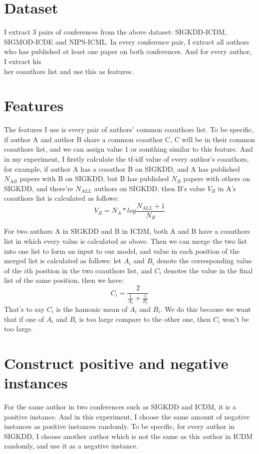 \documentclass{sigkddExp}
\begin{document}
\section{Dataset}
I extract 3 pairs of conferences from the above dataset: SIGKDD-ICDM,
SIGMOD-ICDE and NIPS-ICML. In every conference pair, I extract all authors
who has published at least one paper on both conferences. And for every
author, I extract his\\her coauthors list and use this as features.

\section{Features}
The features I use is every pair of authors' common coauthors list. To be
specific, if author A and author B share a common coauthor C, C
will be in their common coauthors list, and we can assign value 1 or somthing
similar to this feature. And in my experiment, I firstly calculate the tf-idf
value of every author's coauthors, for example, if author A has a coauthor B on
SIGKDD, and A has published $N_{AB}$ papers with B on SIGKDD, but B has published
$N_B$ papers with others on SIGKDD, and there're $N_{ALL}$ authors on SIGKDD, 
then B's value $V_B$ in A's coauthors list is calculated as follows:
\begin{equation}
V_B = N_A * log\frac{N_{ALL} + 1}{N_B}
\end{equation}

For two authors A in SIGKDD and B in ICDM, both A and B have a coauthors list 
in which every value is calculated as above. Then we can merge the two list into
one list to form an input to our model, and value in each position of the merged
list is calculated as follows: let $A_i$ and $B_i$ denote the corresponding value
of the $i$th position in the two coauthors list, and $C_i$ denotes the value in 
the final list of the same position, then we have:
\begin{equation}
C_i = \frac{2}{\frac{1}{A_i} + \frac{1}{B_i}}
\end{equation}
That's to say $C_i$ is the hamonic mean of $A_i$ and $B_i$. We do this because
we want that if one of $A_i$ and $B_i$ is too large compare to the other one,
then $C_i$ won't be too large.

\section{Construct positive and negative instances}
For the same author in two conferences such as SIGKDD and ICDM, it is a positive
instance. And in this experiment, I choose the same amount of negative instances
as positive instances randomly. To be specific, for every author in SIGKDD, I choose
another author which is not the same as this author in ICDM randomly, and use it 
as a negative instance.
\end{document}
